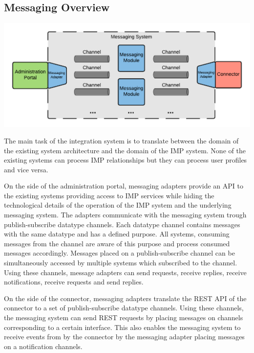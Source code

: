 \subsection{Messaging Overview}

\begin{center}
    \includegraphics[scale=0.6]{Diagrams/Integration Architecture 1/Technological Integration/3. Messaging Integration.pdf}
\end{center}

The main task of the integration system is to translate between the domain of the existing system architecture and the domain of the IMP system. None of the existing systems can process IMP relationships but they can process user profiles and vice versa. 

On the side of the administration portal, messaging adapters provide an API to the existing systems providing access to IMP services while hiding the technological details of the operation of the IMP system and the underlying messaging system. The adapters communicate with the messaging system trough publish-subscribe datatype channels. Each datatype channel contains messages with the same datatype and has a defined purpose. All systems, consuming messages from the channel are aware of this purpose and process consumed messages accordingly. Messages placed on a publish-subscribe channel can be simultaneously accessed by multiple systems which subscribed to the channel. Using these channels, message adapters can send requests, receive replies, receive notifications, receive requests and send replies. 

On the side of the connector, messaging adapters translate the REST API of the connector to a set of publish-subscribe datatype channels. Using these channels, the messaging system can send REST requests by placing messages on channels corresponding to a certain interface. This also enables the messaging system to receive events from by the connector by the messaging adapter placing messages on a notification channels.

